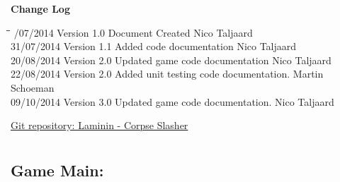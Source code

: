 \documentclass[letterpaper]{article}
\begin{document}

	\newpage
		{\LARGE \bf Change Log}\\[2em]
		
		\begin{tabbing}
			\hspace*{2.5cm}\=\hspace*{2.5cm}\=\hspace*{8cm}\=\hspace*{3cm} /07/2014	\> Version 1.0	\> Document Created 							\> Nico Taljaard \\
			31/07/2014  \> Version 1.1  \> Added code documentation						\> Nico Taljaard\\
			20/08/2014  \> Version 2.0  \> Updated game code documentation				\> Nico Taljaard\\
			22/08/2014  \> Version 2.0  \> Added unit testing code documentation.		\> Martin Schoeman\\
			09/10/2014	\> Version 3.0	\> Updated game code documentation.				\> Nico Taljaard\\
		\end{tabbing}
		
	\newpage
		\renewcommand\contentsname{TABLE OF CONTENTS}
		\newcommand\contentsnameLC{\colorbox{blue}{\makebox[\textwidth-2\fboxsep][l]{\bfseries\color{white} Table of Contents}}}
		
		\renewcommand{\cftdot}{}
		\hypersetup{linktocpage}
		\tableofcontents
		
		\begin{flushleft}
			\LARGE\href{https://github.com/njTaljaard/Laminin_CorpseSlasher/}{Git repository: Laminin - Corpse Slasher}
		\end{flushleft}
		
		\newpage
		
		\section*{\colorbox{blue}{}} 
				\vspace{0.1in}
				
					\subsection*{Game Main:}
					\vspace{0.1in}
						
\end{document}
